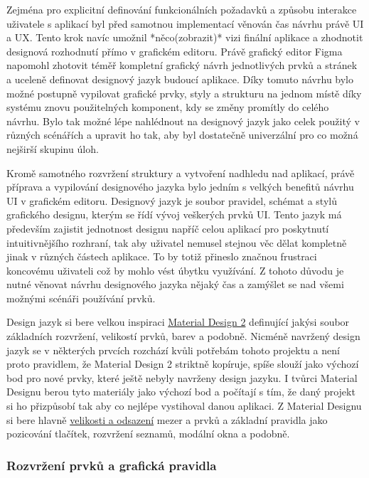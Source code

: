 \begin{itemize}
\begin{itemize}
 	Zejména pro explicitní definování funkcionálních požadavků a způsobu interakce uživatele s aplikací byl před samotnou
	implementací věnován čas návrhu právě \ac{UI} a \ac{UX}.
	Tento krok navíc umožnil *něco(zobrazit)* vizi finální aplikace a zhodnotit designová rozhodnutí přímo v grafickém
	editoru.
	Právě grafický editor Figma napomohl zhotovit téměř kompletní grafický návrh jednotlivých prvků a stránek a uceleně
	definovat designový jazyk budoucí aplikace.
	Díky tomuto návrhu bylo možné postupně vypilovat grafické prvky, styly a strukturu na jednom místě díky systému
	znovu použitelných komponent, kdy se změny promítly do celého návrhu.
	Bylo tak možné lépe nahlédnout na designový jazyk jako celek použitý v různých scénářích a upravit ho tak, aby byl
	dostatečně univerzální pro co možná nejširší skupinu úloh.

	Kromě samotného rozvržení struktury a vytvoření nadhledu nad aplikací, právě příprava a vypilování designového jazyka
	bylo jedním s velkých benefitů návrhu \ac{UI} v grafickém editoru.
	Designový jazyk je soubor pravidel, schémat a stylů grafického designu, kterým se řídí vývoj veškerých prvků \ac{UI}.
	Tento jazyk má především zajistit jednotnost designu napříč celou aplikací pro poskytnutí intuitivnějšího rozhraní,
	tak aby uživatel nemusel stejnou věc dělat kompletně jinak v různých částech aplikace.
	To by totiž přineslo značnou frustraci koncovému uživateli což by mohlo vést úbytku využívání.
	Z tohoto důvodu je nutné věnovat návrhu designového jazyka nějaký čas a zamýšlet se nad všemi možnými scénáři používání
	prvků.

	Design jazyk si bere velkou inspiraci \href{https://material.io/}{Material Design 2} definující jakýsi soubor
	základních rozvržení, velikostí prvků, barev a podobně.
	Nicméně navržený design jazyk se v některých prvcích rozchází kvůli potřebám tohoto projektu a není proto pravidlem,
	že Material Design 2 striktně kopíruje, spíše slouží jako výchozí bod pro nové prvky, které ještě nebyly navrženy
	design jazyku.
	I tvůrci Material Designu berou tyto materiály jako výchozí bod a počítají s tím, že daný projekt si ho přizpůsobí
	tak aby co nejlépe vystihoval danou aplikaci.
	Z Material Designu si bere hlavně \href{https://material.io/design/layout/spacing-methods.html#baseline-grid}{velikosti a odsazení}
	mezer a prvků a základní pravidla jako pozicování tlačítek, rozvržení seznamů, modální okna a podobně.

		\subsubsection{Rozvržení prvků a grafická pravidla}


\end{itemize}
\end{itemize}
